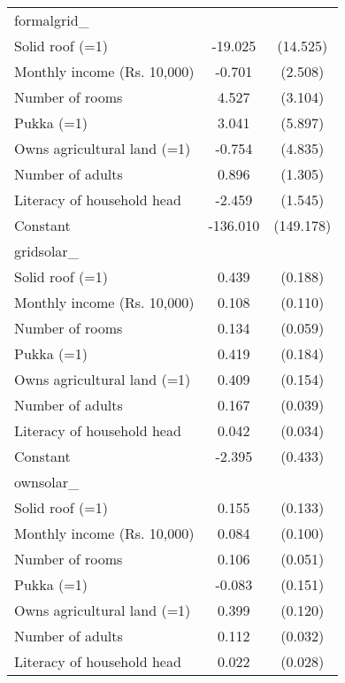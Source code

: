 \begin{table}[htbp]
\begin{tabular}{l*{1}{cc}}
\midrule
formalgrid\_         &                     &            \\
Solid roof (=1)     &     -19.025         &    (14.525)\\
Monthly income (Rs. 10,000)&      -0.701         &     (2.508)\\
Number of rooms     &       4.527         &     (3.104)\\
Pukka (=1)          &       3.041         &     (5.897)\\
Owns agricultural land (=1)&      -0.754         &     (4.835)\\
Number of adults    &       0.896         &     (1.305)\\
Literacy of household head&      -2.459         &     (1.545)\\
Constant            &    -136.010         &   (149.178)\\
\midrule
gridsolar\_          &                     &            \\
Solid roof (=1)     &       0.439\sym{**} &     (0.188)\\
Monthly income (Rs. 10,000)&       0.108         &     (0.110)\\
Number of rooms     &       0.134\sym{**} &     (0.059)\\
Pukka (=1)          &       0.419\sym{**} &     (0.184)\\
Owns agricultural land (=1)&       0.409\sym{***}&     (0.154)\\
Number of adults    &       0.167\sym{***}&     (0.039)\\
Literacy of household head&       0.042         &     (0.034)\\
Constant            &      -2.395\sym{***}&     (0.433)\\
\midrule
ownsolar\_           &                     &            \\
Solid roof (=1)     &       0.155         &     (0.133)\\
Monthly income (Rs. 10,000)&       0.084         &     (0.100)\\
Number of rooms     &       0.106\sym{**} &     (0.051)\\
Pukka (=1)          &      -0.083         &     (0.151)\\
Owns agricultural land (=1)&       0.399\sym{***}&     (0.120)\\
Number of adults    &       0.112\sym{***}&     (0.032)\\
Literacy of household head&       0.022         &     (0.028)\\

\end{tabular}
\end{table}
